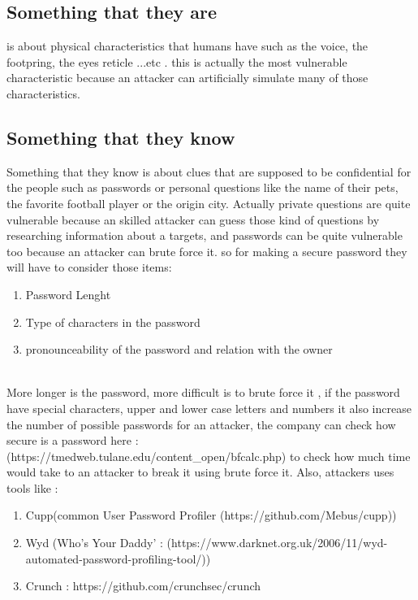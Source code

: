 \documentclass[10pt,a4paper]{article} %
\begin{document}
        \subsection{Something that they are}
            is about physical characteristics that humans have such as the
            voice, the footpring, the eyes reticle ...etc . this is actually the
            most vulnerable characteristic because an attacker can artificially
            simulate many of those characteristics.

        \subsection{Something that they know}
            Something that they know is about clues that are supposed to be
            confidential for the people
            such as passwords or personal questions like the name of their pets,
            the favorite football player or the origin city.
            Actually private questions are quite vulnerable because an skilled
            attacker can guess those kind of questions by researching information
            about a targets, and passwords can be quite vulnerable too because an
            attacker can brute force it. so for making a secure password they will
            have to consider those items: 
            \\ 
        \begin{enumerate}
            \item {Password Lenght} 
            \item {Type of characters in the password} 
            \item {pronounceability of the password and relation with the owner} 
        \end{enumerate}
            \\ 
            More longer is the password, more difficult is to brute force it , if
            the password have special characters, upper and lower case letters and
            numbers it also increase the number of possible passwords for an
            attacker, the company can check how secure is a password here :
            (https://tmedweb.tulane.edu/content\_open/bfcalc.php) to check how much
            time would take to an attacker to break it using brute force it. Also, attackers uses tools like :
            \\ 
        \begin{enumerate}
            \item {Cupp(common User Password Profiler (https://github.com/Mebus/cupp))} 
            \item {Wyd (Who's Your Daddy' : (https://www.darknet.org.uk/2006/11/wyd-automated-password-profiling-tool/))} 
            \item {Crunch : https://github.com/crunchsec/crunch} 
        \end{enumerate}
        
\end{document}
